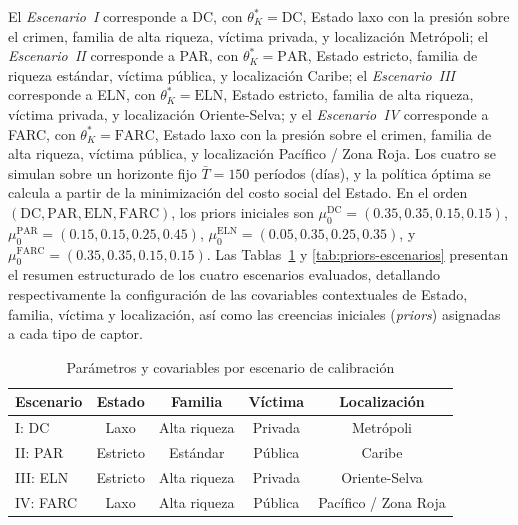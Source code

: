 \documentclass[pdflatex,sn-mathphys-ay]{sn-jnl}
\theoremstyle{thmstyleone}
\theoremstyle{thmstyletwo}
\theoremstyle{thmstylethree}
\newcommand{\1}{\mathbf{1}}
\begin{document}
El \emph{Escenario~I} corresponde a DC, con $\theta_K^\ast=\mathrm{DC}$, Estado laxo con la presión sobre el crimen, familia de alta riqueza, víctima privada, y localización Metrópoli; el \emph{Escenario~II} corresponde a PAR, con $\theta_K^\ast=\mathrm{PAR}$, Estado estricto, familia de riqueza estándar, víctima pública, y localización Caribe; el \emph{Escenario~III} corresponde a ELN, con $\theta_K^\ast=\mathrm{ELN}$, Estado estricto, familia de alta riqueza, víctima privada, y localización Oriente-Selva; y el \emph{Escenario~IV} corresponde a FARC, con $\theta_K^\ast=\mathrm{FARC}$, Estado laxo con la presión sobre el crimen, familia de alta riqueza, víctima pública, y localización Pacífico / Zona Roja. Los cuatro se simulan sobre un horizonte fijo $\bar{T}=150$ períodos (días), y la política óptima se calcula a partir de la minimización del costo social del Estado. En el orden $(\mathrm{DC},\mathrm{PAR},\mathrm{ELN},\mathrm{FARC})$, los priors iniciales son $\mu_0^{\mathrm{DC}}=(0.35,0.35,0.15,0.15)$, $\mu_0^{\mathrm{PAR}}=(0.15,0.15,0.25,0.45)$, $\mu_0^{\mathrm{ELN}}=(0.05,0.35,0.25,0.35)$, y $\mu_0^{\mathrm{FARC}}=(0.35,0.35,0.15,0.15)$. Las Tablas~\ref{tab:covariables-escenarios} y \ref{tab:priors-escenarios} presentan el resumen estructurado de los cuatro escenarios evaluados, detallando respectivamente la configuración de las covariables contextuales de Estado, familia, víctima y localización, así como las creencias iniciales (\emph{priors}) asignadas a cada tipo de captor.

\begin{table}[!ht]
\small
\caption{Parámetros y covariables por escenario de calibración}
\label{tab:covariables-escenarios}
\begin{tabular}{lcccc}
\toprule
Escenario & Estado & Familia & Víctima & Localización \\ \midrule
I: DC & Laxo & Alta riqueza & Privada & Metrópoli \\
II: PAR & Estricto & Estándar & Pública & Caribe \\
III: ELN & Estricto & Alta riqueza & Privada & Oriente-Selva \\
IV: FARC & Laxo & Alta riqueza & Pública & Pacífico / Zona Roja \\ \bottomrule
\end{tabular}
\end{table}
\end{document}
